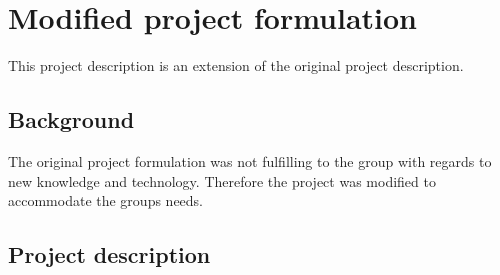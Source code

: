 \section{Modified project formulation}
This project description is an extension of the original project description. 
\subsection{Background}
The original project formulation was not fulfilling to the group with regards to new knowledge and technology. Therefore the project was modified to accommodate the groups needs.

\subsection{Project description}


